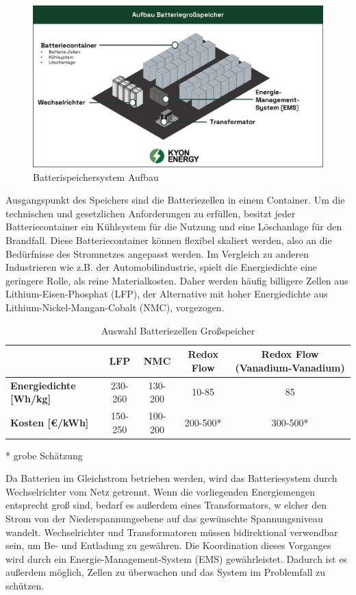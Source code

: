 \begin{figure}[h!]
    \centering
    \includegraphics[width=14cm]{Abbildungen/StandDerTechnikAbb4jpg.jpg}
    \caption{Batterispeichersystem Aufbau}\label{fig:Batterispeichersystem_Aufbau}
\end{figure}

Ausgangspunkt des Speichers sind die Batteriezellen in einem Container. 
Um die technischen und gesetzlichen Anforderungen zu erfüllen, besitzt jeder Batteriecontainer ein Kühlsystem für die Nutzung und eine Löschanlage für den Brandfall. 
Diese Batteriecontainer können flexibel skaliert werden, also an die Bedürfnisse des Stromnetzes angepasst werden. 
Im Vergleich zu anderen Industrieren wie z.B. der Automobilindustrie, spielt die Energiedichte eine geringere Rolle, als reine Materialkosten. 
Daher werden häufig billigere Zellen aus Lithium-Eisen-Phosphat (LFP), der Alternative mit hoher Energiedichte aus Lithium-Nickel-Mangan-Cobalt (NMC), vorgezogen.

\begin{table}[htbp]
    \centering
    \caption{Auswahl Batteriezellen Großspeicher\cite{poworks-comparison}}
    \label{tab:Auswahl_Batteriezellen_Großspeicher}
    \begin{tabular}{lcccc}
       \toprule
        & \textbf{LFP} & \textbf{NMC} & \textbf{Redox Flow} & \textbf{Redox Flow (Vanadium-Vanadium)} \\
        \midrule
        \textbf{Energiedichte [Wh/kg]} & 230-260 & 130-200 & 10-85 & 85 \\
        \textbf{Kosten [€/kWh]} & 150-250 & 100-200 & 200-500* & 300-500* \\
        \bottomrule
    \end{tabular}
\end{table}

* grobe Schätzung

Da Batterien im Gleichstrom betrieben werden, wird das Batteriesystem durch Wechselrichter vom Netz getrennt. 
Wenn die vorliegenden Energiemengen entsprecht groß sind, bedarf es außerdem eines Transformators, w
elcher den Strom von der Niederspannungsebene auf das gewünschte Spannungsniveau wandelt. 
Wechselrichter und Transformatoren müssen bidirektional verwendbar sein, um Be- und Entladung zu gewähren. 
Die Koordination dieses Vorganges wird durch ein Energie-Management-System (EMS) gewährleistet. 
Dadurch ist es außerdem möglich, Zellen zu überwachen und das System im Problemfall zu schützen\cite{kyon-energy}.

